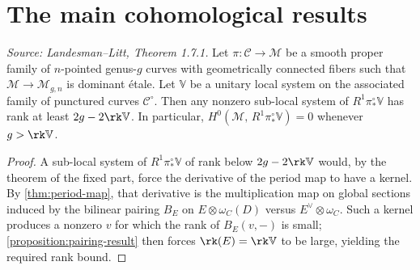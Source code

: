 \section{The main cohomological results}


\begin{theorem}
  \label{thm:rank-bound-subsystem}
  \textit{Source: Landesman--Litt, Theorem 1.7.1.}
  Let $\pi\colon \mathcal{C} \to \mathcal{M}$ be a smooth proper family of
  $n$-pointed genus-$g$ curves with geometrically connected fibers such that
  $\mathcal{M} \to \mathcal{M}_{g,n}$ is dominant \'{e}tale.
  Let $\mathbb{V}$ be a unitary local system on the associated family of
  punctured curves $\mathcal{C}^\circ$.
  Then any nonzero sub-local system of $R^1\pi^\circ_* \mathbb{V}$ has rank
  at least $2g - 2\rk \mathbb{V}$.
  In particular, $H^0(\mathcal{M},\, R^1\pi^\circ_* \mathbb{V}) = 0$ whenever
  $g > \rk \mathbb{V}$.
\end{theorem}

\begin{proof}
  A sub-local system of $R^1\pi^\circ_* \mathbb{V}$ of rank below
  $2g - 2\rk\mathbb{V}$ would, by the theorem of the fixed part, force the
  derivative of the period map to have a kernel.
  By \cref{thm:period-map}, that derivative is the multiplication map on
  global sections induced by the bilinear pairing $B_E$ on
  $E \otimes \omega_C(D)$ versus $E^\vee \otimes \omega_C$.
  Such a kernel produces a nonzero $v$ for which the rank of $B_E(v, -)$ is
  small; \cref{proposition:pairing-result} then forces $\rk(E) = \rk\mathbb{V}$
  to be large, yielding the required rank bound.
\end{proof}

